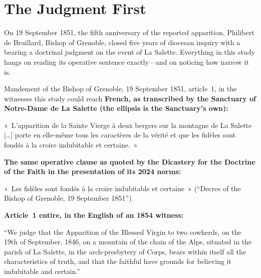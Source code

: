 \section{The Judgment First}

On 19 September 1851, the fifth anniversary of the reported
apparition, Philibert de Bruillard, Bishop of Grenoble, closed five
years of diocesan inquiry with a  bearing a
doctrinal judgment on the event of La Salette. Everything in this
study hangs on reading its operative sentence exactly---and on
noticing how narrow it is.

\begin{operativetext}{Mandement of the Bishop of Grenoble, 19
September 1851, article~1, in the witnesses this study could reach}
\textbf{French, as transcribed by the Sanctuary of Notre-Dame de La
Salette (the ellipsis is the Sanctuary's own):}\par
«~L'apparition de la Sainte Vierge à deux bergers sur la montagne
de La Salette [\ldots] porte en elle-même tous les caractères de la
vérité et que les fidèles sont fondés à la croire indubitable et
certaine.~»\par
\medskip
\textbf{The same operative clause as quoted by the Dicastery for the
Doctrine of the Faith in the presentation of its 2024 norms:}\par
«~Les fidèles sont fondés à la croire indubitable et certaine~»
(``Decree of the Bishop of Grenoble, 19 September 1851'').\par
\medskip
\textbf{Article~1 entire, in the English of an 1854 witness:}\par
``We judge that the Apparition of the Blessed Virgin to two
cowherds, on the 19th of September, 1846, on a mountain of the chain
of the Alps, situated in the parish of La Salette, in the
arch-presbytery of Corps, bears within itself all the
characteristics of truth, and that the faithful have grounds for
believing it indubitable and
certain.''
\end{operativetext}
